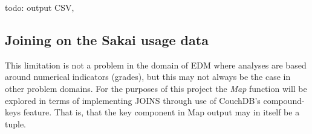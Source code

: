 todo: output CSV,






\subsection*{Joining on the Sakai usage data}


This limitation is not a problem in the domain of EDM where analyses are based around numerical indicators (grades), but this may not always be the case in other problem domains. For the purposes of this project the \textit{Map} function will be explored in terms of implementing JOINS through use of CouchDB's compound-keys feature. That is, that the key component in Map output may in itself be a tuple.

